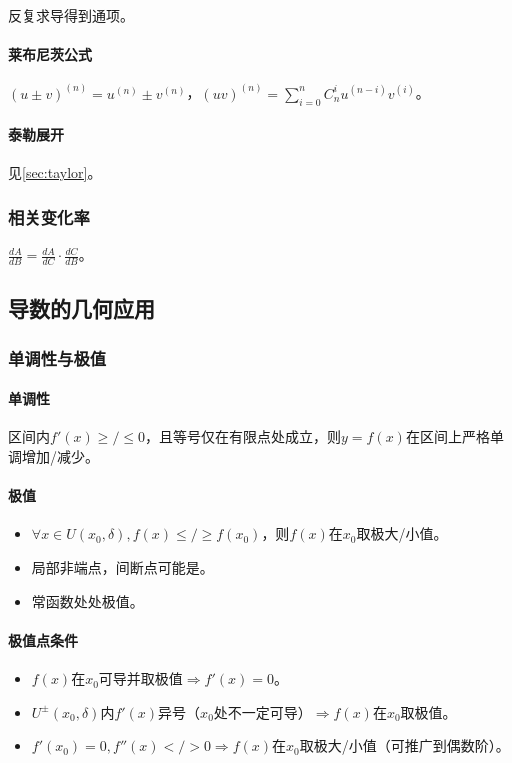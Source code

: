 \documentclass[
12pt, %
a4paper, 
oneside, %
headinclude,footinclude, %
]{scrartcl}
\begin{document}
反复求导得到通项。
\paragraph{莱布尼茨公式}
$ (u \pm v)^{(n)} = u^{(n)} \pm v^{(n)} $，$ (uv)^{(n)} = \sum_{i = 0}^n C_n^i u^{(n - i)}v^{(i)} $。
\paragraph{泰勒展开}
见\ref{sec:taylor}。
\subsubsection[相关变化率]{相关变化率}
$ \frac{dA}{dB} = \frac{dA}{dC} \cdot \frac{dC}{dB} $。
\subsection[导数的几何应用]{导数的几何应用}
\subsubsection[单调性与极值]{单调性与极值}
\paragraph{单调性}
区间内$ f'(x) \geq/\leq 0 $，且等号仅在有限点处成立，则$ y = f(x) $在区间上严格单调增加/减少。
\paragraph{极值}
\begin{itemize}
\item $ \forall x \in U(x_0, \delta), f(x) \leq/\geq f(x_0) $，则$ f(x) $在$ x_0 $取极大/小值。
\item 局部非端点，间断点可能是。
\item 常函数处处极值。
\end{itemize}
\paragraph{极值点条件}
\begin{itemize}
\item $ f(x) $在$ x_0 $可导并取极值$ \Rightarrow $$ f'(x) = 0 $。
\item $ U^\pm (x_0, \delta) $内$ f'(x) $异号（$ x_0 $处不一定可导）$ \Rightarrow $$ f(x) $在$ x_0 $取极值。
\item $ f'(x_0) = 0 , f''(x) </> 0 $$ \Rightarrow $$ f(x) $在$ x_0 $取极大/小值（可推广到偶数阶）。
\end{itemize}
\end{document}
